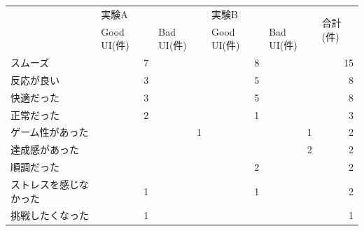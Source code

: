 \begin{table}[htbp]
\centering
\begin{tabular}{lrrrrr}
\hline
            & \multicolumn{1}{l}{実験A}     & \multicolumn{1}{l}{}       & \multicolumn{1}{l}{実験B}     & \multicolumn{1}{l}{}       & \multicolumn{1}{l}{\multirow{2}{*}{合計(件)}} \\ \cline{2-5}
            & \multicolumn{1}{l}{Good UI(件)} & \multicolumn{1}{l}{Bad UI(件)} & \multicolumn{1}{l}{Good UI(件)} & \multicolumn{1}{l}{Bad UI(件)} & \multicolumn{1}{l}{}                    \\ \hline
スムーズ        & 7                           &                            & 8                           &                            & 15                                      \\
反応が良い       & 3                           &                            & 5                           &                            & 8                                       \\
快適だった       & 3                           &                            & 5                           &                            & 8                                       \\
正常だった       & 2                           &                            & 1                           &                            & 3                                       \\
ゲーム性があった    &                             & 1                          &                             & 1                          & 2                                       \\
達成感があった     &                             &                            &                             & 2                          & 2                                       \\
順調だった       &                             &                            & 2                           &                            & 2                                       \\
ストレスを感じなかった & 1                           &                            & 1                           &                            & 2                                       \\
挑戦したくなった    & 1                           &                            &                             &                            & 1                                       \\

\end{tabular}
\end{table}
